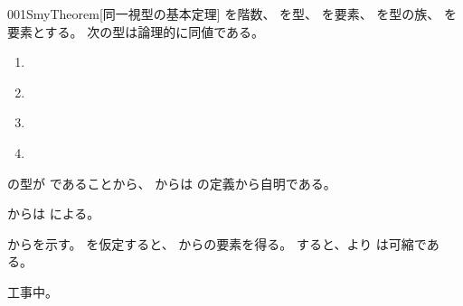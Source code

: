 \documentclass[index]{subfiles}
\begin{document}
\begin{myBlock}{001S}{myTheorem}[同一視型の基本定理]
  を階数、
  を型、
  を要素、
  を型の族、
  を要素とする。
  次の型は論理的に同値である。
  \begin{enumerate}
  \item \label{001S:0000} 
  \item \label{001S:0001} 
  \item \label{001S:0002} 
  \item \label{001S:0003} 
  \end{enumerate}
\end{myBlock}
\begin{myProof}
  の型が
  であることから、
  からは
  \myInlineMath{\myEquiv}の定義から自明である。

  からは
  による。

  からを示す。
  を仮定すると、
  からの要素を得る。
  すると、より
  は可縮である。

  工事中。
\end{myProof}
\end{document}
